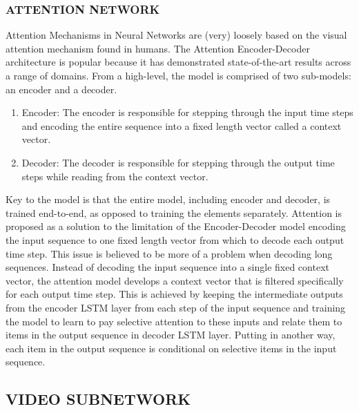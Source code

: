 \documentclass{article}
\begin{document}
\subsubsection{ATTENTION NETWORK}
Attention Mechanisms in Neural Networks are (very) loosely based on the visual attention mechanism found in humans. \cite{Attention_memory} The Attention Encoder-Decoder architecture is popular because it has demonstrated state-of-the-art results across a range of domains.\cite{Attention_ML} From a high-level, the model is comprised of two sub-models: an encoder and a decoder.
\begin{enumerate}
    \item Encoder: The encoder is responsible for stepping through the input time steps and encoding the entire sequence into a fixed length vector called a context vector.
    \item Decoder: The decoder is responsible for stepping through the output time steps while reading from the context vector.
\end{enumerate}
Key to the model is that the entire model, including encoder and decoder, is trained end-to-end, as opposed to training the elements separately. Attention is proposed as a solution to the limitation of the Encoder-Decoder model encoding the input sequence to one fixed length vector from which to decode each output time step. This issue is believed to be more of a problem when decoding long sequences. Instead of decoding the input sequence into a single fixed context vector, the attention model develops a context vector that is filtered specifically for each output time step. This is achieved by keeping the intermediate outputs from the encoder LSTM layer from each step of the input sequence and training the model to learn to pay selective attention to these inputs and relate them to items in the output sequence in decoder LSTM layer. Putting in another way, each item in the output sequence is conditional on selective items in the input sequence.


\subsection{VIDEO SUBNETWORK}
\end{document}
